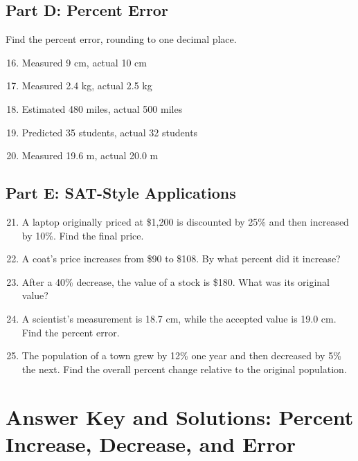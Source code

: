 \documentclass[14pt]{extarticle}
\begin{document}
\subsection*{Part D: Percent Error}
Find the percent error, rounding to one decimal place.
\begin{enumerate}
  \setcounter{enumi}{15}
  \item Measured 9 cm, actual 10 cm
  \item Measured 2.4 kg, actual 2.5 kg
  \item Estimated 480 miles, actual 500 miles
  \item Predicted 35 students, actual 32 students
  \item Measured 19.6 m, actual 20.0 m
\end{enumerate}

\subsection*{Part E: SAT-Style Applications}
\begin{enumerate}
  \setcounter{enumi}{20}
  \item A laptop originally priced at \$1,200 is discounted by 25\% and then increased by 10\%. Find the final price.
  \item A coat’s price increases from \$90 to \$108. By what percent did it increase?
  \item After a 40\% decrease, the value of a stock is \$180. What was its original value?
  \item A scientist’s measurement is 18.7 cm, while the accepted value is 19.0 cm. Find the percent error.
  \item The population of a town grew by 12\% one year and then decreased by 5\% the next. Find the overall percent change relative to the original population.
\end{enumerate}

\newpage

\section*{Answer Key and Solutions: Percent Increase, Decrease, and Error}
\end{document}
